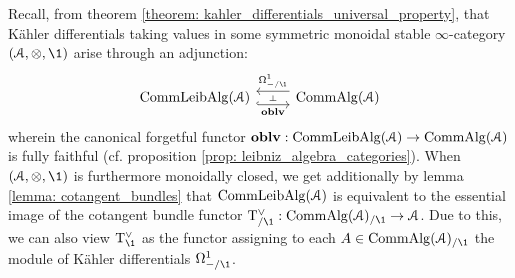                    \begin{remark} \label{remark: cotangent_bundles_and_kahler_differentials}
                        Recall, from theorem \ref{theorem: kahler_differentials_universal_property}, that K\"ahler differentials taking values in some symmetric monoidal stable $\infty$-category $(\calA, \tensor, \1)$ arise through an adjunction:
                            $$
                                \begin{tikzcd}
                                	{\Comm\Leib\Alg(\calA)} & {\Comm\Alg(\calA)}
                                	\arrow[""{name=0, anchor=center, inner sep=0}, "\oblv"', shift right=2, hook, from=1-1, to=1-2]
                                	\arrow[""{name=1, anchor=center, inner sep=0}, "{\Omega^1_{-/\1}}"', shift right=2, from=1-2, to=1-1]
                                	\arrow["\dashv"{anchor=center, rotate=-90}, draw=none, from=1, to=0]
                                \end{tikzcd}
                            $$
                        wherein the canonical forgetful functor $\mathbf{oblv}: \mathrm{Comm}\mathrm{Leib}\mathrm{Alg}(\mathcal{A}) \to \mathrm{Comm}\mathrm{Alg}(\mathcal{A})$ is fully faithful (cf. proposition \ref{prop: leibniz_algebra_categories}). When $(\calA, \tensor, \1)$ is furthermore monoidally closed, we get additionally by lemma \ref{lemma: cotangent_bundles} that $\mathrm{Comm}\mathrm{Leib}\mathrm{Alg}(\mathcal{A})$ is equivalent to the essential image of the cotangent bundle functor $\tangent^{\vee}_{/\1}: \Comm\Alg(\calA)_{/\1} \to \calA$. Due to this, we can also view $\tangent^{\vee}_{\1}$ as the functor assigning to each $A \in \Comm\Alg(\calA)_{/\1}$ the module of K\"ahler differentials $\Omega^1_{-/\1}$.
                    \end{remark}
                
